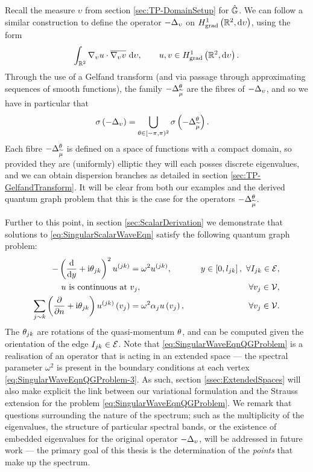 Recall the measure $\upsilon$ from section \ref{sec:TP-DomainSetup} for $\hat{\mathbb{G}}$.
We can follow a similar construction to define the operator $-\Delta_{\upsilon}$ on $H^1_\mathrm{grad}\left( \mathbb{R}^2, \mathrm{d}\upsilon \right)$, using the form
\begin{align*}
	\int_{\mathbb{R}^2} \nabla_{\upsilon}u\cdot\overline{\nabla_{\upsilon}v}  \ \mathrm{d}\upsilon,
	\qquad u,v\in H^1_\mathrm{grad}\left( \mathbb{R}^2, \mathrm{d}\upsilon \right).
\end{align*}
Through the use of a Gelfand transform (and via passage through approximating sequences of smooth functions), the family $-\Delta_{\widetilde{\mu}}^{\theta}$ are the fibres of $-\Delta_{\upsilon}$, and so we have in particular that
\begin{align*}
	\sigma\left(  -\Delta_{\upsilon}  \right) &= \bigcup_{\theta\in[-\pi,\pi)^2} \sigma\left(  -\Delta_{\widetilde{\mu}}^{\theta}  \right).
\end{align*}
Each fibre $-\Delta_{\widetilde{\mu}}^{\theta}$ is defined on a space of functions with a compact domain, so provided they are (uniformly) elliptic they will each posses discrete eigenvalues, and we can obtain dispersion branches as detailed in section \ref{sec:TP-GelfandTransform}.
It will be clear from both our examples and the derived quantum graph problem that this is the case for the operators $-\Delta_{\widetilde{\mu}}^{\theta}$.

Further to this point, in section \ref{sec:ScalarDerivation} we demonstrate that solutions to \eqref{eq:SingularScalarWaveEqn} satisfy the following quantum graph problem:
\begin{subequations} \label{eq:SingularWaveEqnQGProblem}
	\begin{align}
		-\left( \dfrac{\mathrm{d}}{\mathrm{d}y} + \mathrm{i}\theta_{jk} \right)^2 u^{(jk)} &= \omega^2 u^{(jk)}, \quad &y\in\left[ 0,l_{jk} \right], \ \forall I_{jk}\in\mathcal{E}, \label{eq:SingularWaveEqnQGProblem-1} \\
		u \text{ is continuous at } & v_j, \quad &\forall v_j\in\mathcal{V}, \label{eq:SingularWaveEqnQGProblem-2} \\
		\sum_{j\sim k}\left( \dfrac{\partial }{\partial n} + \mathrm{i}\theta_{jk} \right)u^{(jk)}\left( v_j \right) &= \omega^2\alpha_j u\left( v_j \right), \quad &\forall v_j\in\mathcal{V}. \label{eq:SingularWaveEqnQGProblem-3}
	\end{align}
\end{subequations}
The $\theta_{jk}$ are rotations of the quasi-momentum $\theta$, and can be computed given the orientation of the edge $I_{jk}\in\mathcal{E}$.
Note that \eqref{eq:SingularWaveEqnQGProblem} is a realisation of an operator that is acting in an extended space --- the spectral parameter $\omega^2$ is present in the boundary conditions at each vertex \eqref{eq:SingularWaveEqnQGProblem-3}.
As such, section \ref{ssec:ExtendedSpaces} will also make explicit the link between our variational formulation and the Strauss extension for the problem \eqref{eq:SingularWaveEqnQGProblem}.
We remark that questions surrounding the nature of the spectrum; such as the multiplicity of the eigenvalues, the structure of particular spectral bands, or the existence of embedded eigenvalues for the original operator $-\Delta_{\upsilon}$, will be addressed in future work --- the primary goal of this thesis is the determination of the \emph{points} that make up the spectrum.


